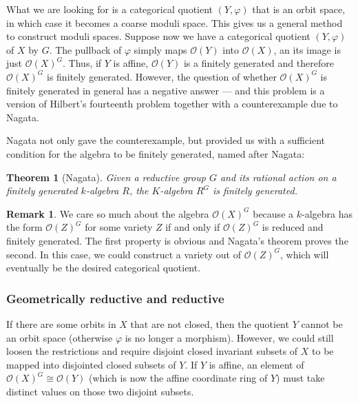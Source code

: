 \documentclass[12pt]{article}
\newtheorem{theorem}{Theorem}[section]
\theoremstyle{remark}
\theoremstyle{definition}
\newtheorem{remark}{Remark}[section]
\begin{document}
    What we are looking for is a categorical quotient $(Y,\varphi)$ that is an orbit space, in which case it becomes a coarse moduli space. This gives us a general method to construct moduli spaces. Suppose now we have a categorical quotient $(Y,\varphi)$ of $X$ by $G$. The pullback of $\varphi$ simply maps $\mathcal O(Y)$ into $\mathcal O(X)$, an its image is just $\mathcal O(X)^G$. Thus, if $Y$ is affine, $\mathcal O(Y)$ is a finitely generated and therefore $\mathcal O(X)^G$ is finitely generated. However, the question of whether $\mathcal O(X)^G$ is finitely generated in general has a negative answer --- and this problem is a version of Hilbert's fourteenth problem together with a counterexample due to Nagata. 

    Nagata not only gave the counterexample, but provided us with a sufficient condition for the algebra to be finitely generated, named after Nagata:
    \begin{theorem}[Nagata]
        Given a reductive group $G$ and its rational action on a finitely generated $k$-algebra $R$, the $K$-algebra $R^G$ is finitely generated.
    \end{theorem}
    \begin{remark}
        We care so much about the algebra $\mathcal O(X)^G$ because a $k$-algebra has the form $\mathcal O(Z)^G$ for some variety $Z$ if and only if $\mathcal O(Z)^G$ is reduced and finitely generated. The first property is obvious and Nagata's theorem proves the second. In this case, we could construct a variety out of $\mathcal O(Z)^G$, which will eventually be the desired categorical quotient.
    \end{remark}
    \subsubsection{Geometrically reductive and reductive}
    If there are some orbits in $X$ that are not closed, then the quotient $Y$ cannot be an orbit space (otherwise $\varphi$ is no longer a morphism). However, we could still loosen the restrictions and require disjoint closed invariant subsets of $X$ to be mapped into disjointed closed subsets of $Y$. If $Y$ is affine, an element of $\mathcal O(X)^G\cong \mathcal O(Y)$ (which is now the affine coordinate ring of $Y$) must take distinct values on those two disjoint subsets.
\end{document}
